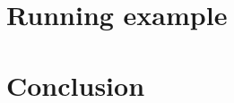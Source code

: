 \documentclass[runningheads]{llncs}
\begin{document}
\section{Running example}



\section{Conclusion} \label{sec:conclusion}



\end{document}
